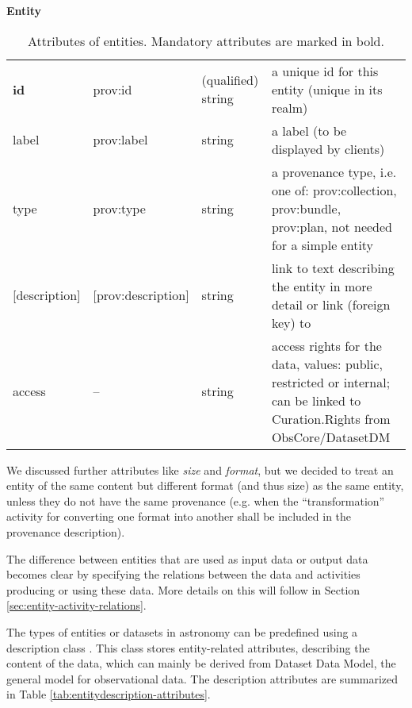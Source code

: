 \begin{table}[h]

\small
{}\textwidth

\textbf{\normalsize Entity}\vspace{0.25em}\\
\begin{tabulary}{1.0\textwidth}{@{}lp{3.5cm}p{2cm}L@{}}
\toprule
{} &  &  & \\
\midrule
\textbf{id} & prov:id & (qualified) string & a unique id for this entity (unique in its realm)\\
label        & prov:label & string & a label (to be displayed by clients)\\
type         & prov:type  & string & a provenance type, i.e. one of: prov:collection, prov:bundle, prov:plan, not needed for a simple entity\\
{[description]}  & [prov:description] & string & link to text describing the entity in more detail or link (foreign key) to \\
access            & -- & string & access rights for the data, values: public, restricted or internal; can be linked to Curation.Rights from ObsCore/DatasetDM\\
\bottomrule
\end{tabulary}
\caption{Attributes of entities. Mandatory attributes are marked in bold.
}\label{tab:entity-attributes}
\end{table}

We discussed further attributes like \emph{size} and \emph{format}, but we decided to treat an
entity of the same content but different format (and thus size) as the same entity,
unless they do not have the same provenance (e.g. when the ``transformation'' activity
for converting one format into another shall be included in the provenance description).


The difference between entities that are used as input data or output data 
becomes clear by specifying the relations between the data and activities producing or using these data.
More details on this will follow in Section \ref{sec:entity-activity-relations}.

The types of entities or datasets in astronomy can be predefined using a description
class .
This class stores entity-related 
attributes, describing the content of the data, which can mainly be derived from 
Dataset Data Model, the general model for observational data.
The description attributes are summarized in Table 
\ref{tab:entitydescription-attributes}.

